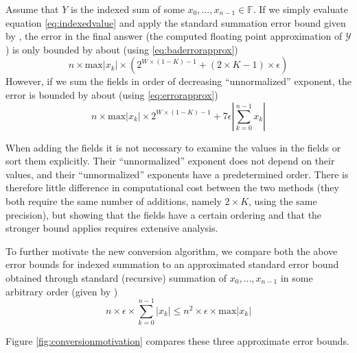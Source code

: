 \documentclass[12pt]{article}
\providecommand{\F}{\ensuremath{\mathbb{F}}}
\providecommand{\max}{\ensuremath{\text{max}}}
\theoremstyle{definition}
\numberwithin{equation}{section}
\numberwithin{figure}{section}
\begin{document}
    Assume that $Y$ is the indexed sum of some $x_0, ..., x_{n - 1} \in \F$. If we simply evaluate equation \eqref{eq:indexedvalue} and apply the standard summation error bound given by \cite{higham}, the error in the final answer (the computed floating point approximation of $\mathcal{Y}$) is only bounded by about (using  \eqref{eq:baderrorapprox})
    \begin{equation}
      n \times \max|x_k|\times (2^{W \times (1 - K) - 1} + (2 \times K - 1) \times \epsilon)
      \label{eq:baderrorapproxdup}
    \end{equation}
    However, if we sum the fields in order of decreasing ``unnormalized'' exponent, the error is bounded by about (using  \eqref{eq:errorapprox})
    \begin{equation}
      n \times \max|x_k|\times 2^{W \times (1 - K) - 1} + 7 \epsilon |\sum\limits_{k = 0}^{n - 1} x_k|
      \label{eq:errorapproxdup}
    \end{equation}

    When adding the fields it is not necessary to examine the values in the fields or sort them explicitly. Their ``unnormalized'' exponent does not depend on their values, and their ``unnormalized'' exponents have a predetermined order. There is therefore little difference in computational cost between the two methods (they both require the same number of additions, namely $2 \times K$, using the same precision), but showing that the fields have a certain ordering and that the stronger bound applies requires extensive analysis.

    To further motivate the new conversion algorithm, we compare both the above error bounds for indexed summation to an approximated standard error bound obtained through standard (recursive) summation of $x_0, ..., x_{n - 1}$ in some arbitrary order (given by \cite{higham})
    \begin{equation}
      n \times \epsilon \times \sum\limits_{k = 0}^{n - 1}|x_k| \leq n^2 \times \epsilon \times \max|x_k|
      \label{eq:naiveerrorapproxdup}
    \end{equation}

    Figure \ref{fig:conversionmotivation} compares these three approximate error bounds.
\end{document}
